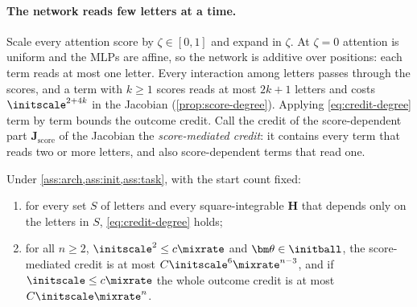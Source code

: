 \paragraph{The network reads few letters at a time.} Scale every attention score by $\zeta\in[0,1]$ and expand in $\zeta$. At $\zeta=0$ attention is uniform
and the MLPs are affine, so the network is additive over positions: each term reads at most one letter. Every interaction among letters
passes through the scores, and a term with $k\ge1$ scores reads at most $2k+1$ letters and costs $\initscale^{2+4k}$ in the Jacobian
(\cref{prop:score-degree}). Applying \cref{eq:credit-degree} term by term bounds the outcome credit. Call the credit of the score-dependent part
$\mathbf J_{\mathrm{score}}$ of the Jacobian the \emph{score-mediated credit}: it contains every term that reads two or more letters, and
also score-dependent terms that read one.

\begin{theorem}
\label{thm:main}
Under \cref{ass:arch,ass:init,ass:task}, with the start count fixed:
\begin{enumerate}[label=(\roman*),leftmargin=*,itemsep=0pt,topsep=2pt]
\item for every set $S$ of letters and every square-integrable $\mathbf H$ that depends only on the letters in $S$, \cref{eq:credit-degree} holds;
\item for all $n\ge2$, $\initscale^2\le c\mixrate$ and $\bm\theta\in\initball$, the score-mediated credit is at most $C\initscale^6\mixrate^{n-3}$, and if
$\initscale\le c\mixrate$ the whole outcome credit is at most $C\initscale\mixrate^n$.
\end{enumerate}
\end{theorem}

